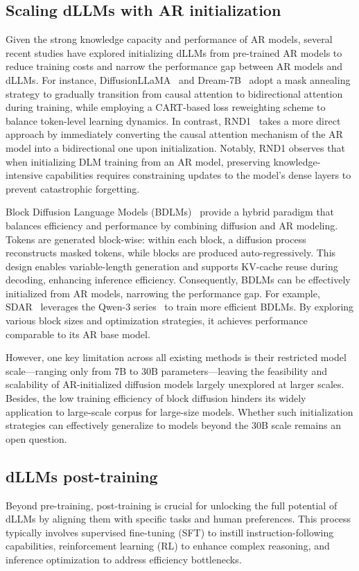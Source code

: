 \subsection{Scaling dLLMs with AR initialization}
Given the strong knowledge capacity and performance of AR models, several recent studies have explored initializing dLLMs from pre-trained AR models to reduce training costs and narrow the performance gap between AR models and dLLMs. For instance, DiffusionLLaMA~\citep{diffullama} and Dream-7B~\citep{Dream7B2025} adopt a mask annealing strategy to gradually transition from causal attention to bidirectional attention during training, while employing a CART-based loss reweighting scheme to balance token-level learning dynamics. In contrast, RND1~\citep{RND1} takes a more direct approach by immediately converting the causal attention mechanism of the AR model into a bidirectional one upon initialization. Notably, RND1 observes that when initializing DLM training from an AR model, preserving knowledge-intensive capabilities requires constraining updates to the model’s dense layers to prevent catastrophic forgetting.

Block Diffusion Language Models (BDLMs)~\citep{Blockdiffusion2025} provide a hybrid paradigm that balances efficiency and performance by combining diffusion and AR modeling. Tokens are generated block-wise: within each block, a diffusion process reconstructs masked tokens, while blocks are produced auto-regressively. 
This design enables variable-length generation and supports KV-cache reuse during decoding, enhancing inference efficiency. Consequently, BDLMs can be effectively initialized from AR models, narrowing the performance gap. For example, SDAR~\citep{SDAR2025} leverages the Qwen-3 series~\citep{yang2025qwen3} to train more efficient BDLMs. By exploring various block sizes and optimization strategies, it achieves performance comparable to its AR base model. 

However, one key limitation across all existing methods is their restricted model scale—ranging only from 7B to 30B parameters—leaving the feasibility and scalability of AR-initialized diffusion models largely unexplored at larger scales. 
Besides, the low training efficiency of block diffusion hinders its widely application to large-scale corpus for large-size models. 
Whether such initialization strategies can effectively generalize to models beyond the 30B scale remains an open question.


\subsection{dLLMs post-training}
Beyond pre-training, post-training is crucial for unlocking the full potential of dLLMs by aligning them with specific tasks and human preferences. This process typically involves supervised fine-tuning (SFT) to instill instruction-following capabilities, reinforcement learning (RL) to enhance complex reasoning, and inference optimization to address efficiency bottlenecks.


